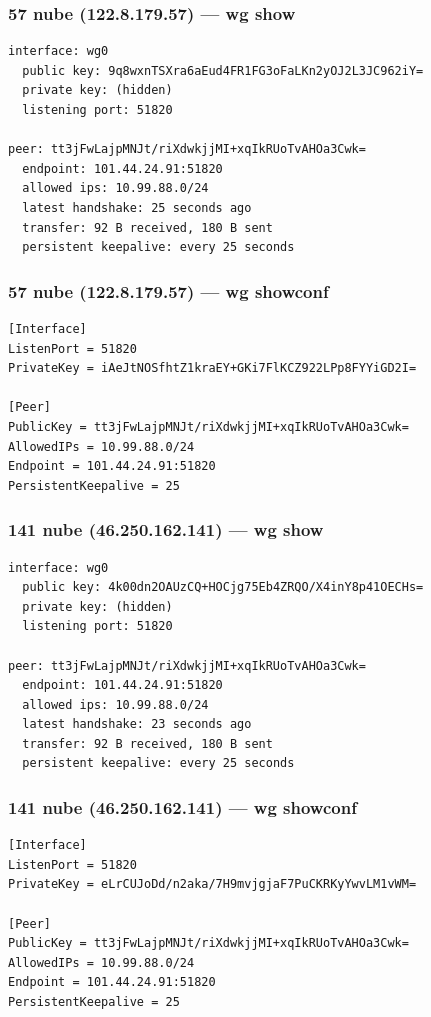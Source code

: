 \documentclass[11pt,a4paper]{article}
\begin{document}
\subsubsection*{57 nube (122.8.179.57) — wg show}
\begin{lstlisting}
interface: wg0
  public key: 9q8wxnTSXra6aEud4FR1FG3oFaLKn2yOJ2L3JC962iY=
  private key: (hidden)
  listening port: 51820

peer: tt3jFwLajpMNJt/riXdwkjjMI+xqIkRUoTvAHOa3Cwk=
  endpoint: 101.44.24.91:51820
  allowed ips: 10.99.88.0/24
  latest handshake: 25 seconds ago
  transfer: 92 B received, 180 B sent
  persistent keepalive: every 25 seconds

\end{lstlisting}

\subsubsection*{57 nube (122.8.179.57) — wg showconf}
\begin{lstlisting}
[Interface]
ListenPort = 51820
PrivateKey = iAeJtNOSfhtZ1kraEY+GKi7FlKCZ922LPp8FYYiGD2I=

[Peer]
PublicKey = tt3jFwLajpMNJt/riXdwkjjMI+xqIkRUoTvAHOa3Cwk=
AllowedIPs = 10.99.88.0/24
Endpoint = 101.44.24.91:51820
PersistentKeepalive = 25

\end{lstlisting}

\subsubsection*{141 nube (46.250.162.141) — wg show}
\begin{lstlisting}
interface: wg0
  public key: 4k00dn2OAUzCQ+HOCjg75Eb4ZRQO/X4inY8p41OECHs=
  private key: (hidden)
  listening port: 51820

peer: tt3jFwLajpMNJt/riXdwkjjMI+xqIkRUoTvAHOa3Cwk=
  endpoint: 101.44.24.91:51820
  allowed ips: 10.99.88.0/24
  latest handshake: 23 seconds ago
  transfer: 92 B received, 180 B sent
  persistent keepalive: every 25 seconds

\end{lstlisting}

\subsubsection*{141 nube (46.250.162.141) — wg showconf}
\begin{lstlisting}
[Interface]
ListenPort = 51820
PrivateKey = eLrCUJoDd/n2aka/7H9mvjgjaF7PuCKRKyYwvLM1vWM=

[Peer]
PublicKey = tt3jFwLajpMNJt/riXdwkjjMI+xqIkRUoTvAHOa3Cwk=
AllowedIPs = 10.99.88.0/24
Endpoint = 101.44.24.91:51820
PersistentKeepalive = 25

\end{lstlisting}
\end{document}
